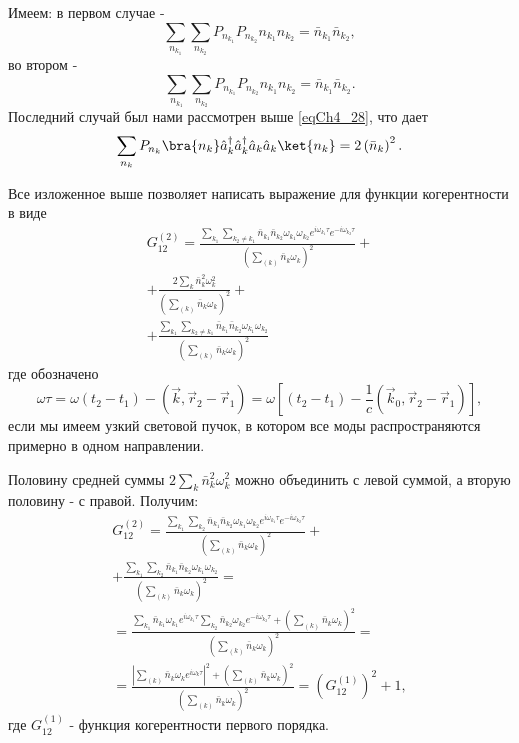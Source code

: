 Имеем: в первом случае -
\begin{equation}
\sum_{n_{k_1}}\sum_{n_{k_2}} P_{n_{k_1}} P_{n_{k_2}} 
n_{k_1} n_{k_2} = \bar{n}_{k_1} \bar{n}_{k_2},
\label{eqCh4_34}
\end{equation}
во втором -
\begin{equation}
\sum_{n_{k_1}}\sum_{n_{k_2}} P_{n_{k_1}} P_{n_{k_2}} 
n_{k_1} n_{k_2} = \bar{n}_{k_1} \bar{n}_{k_2}.
\label{eqCh4_35}
\end{equation}
Последний случай был нами рассмотрен выше \eqref{eqCh4_28}, что дает
\begin{equation}
\sum_{n_{k}} P_{n_{k}}
\bra{n_k}\hat{a}_k^{\dag}\hat{a}_k^{\dag}\hat{a}_k\hat{a}_k\ket{n_k}
= 2 \left(\bar{n}_k\right)^2.
\label{eqCh4_36}
\end{equation}

Все изложенное выше позволяет написать выражение для функции
когерентности в виде 
\begin{eqnarray}
G_{12}^{(2)} = \frac{\sum_{k_1}\sum_{k_2 \neq k_1} \bar{n}_{k_1}
  \bar{n}_{k_2} \omega_{k_1} \omega_{k_2} e^{i \omega_{k_1} \tau} 
e^{- i \omega_{k_2} \tau} } 
{\left(\sum_{(k)} \bar{n}_k \omega_k\right)^2} + 
\nonumber \\
+
\frac{2 \sum_{k} \bar{n}_{k}^2 \omega_k^2} 
{\left(\sum_{(k)} \bar{n}_k \omega_k\right)^2} + 
\nonumber \\
+
\frac{\sum_{k_1}\sum_{k_2 \neq k_1} \bar{n}_{k_1}
  \bar{n}_{k_2} \omega_{k_1} \omega_{k_2}} 
{\left(\sum_{(k)} \bar{n}_k \omega_k\right)^2}
\label{eqCh4_37}
\end{eqnarray}
где обозначено 
\[
\omega \tau = \omega \left(t_2 - t_1\right) - \left(\vec{k}, \vec{r}_2
- \vec{r}_1\right) = 
\omega \left[
\left(t_2 - t_1\right) - \frac{1}{c}\left(\vec{k}_0, \vec{r}_2
- \vec{r}_1\right)
\right],
\]
если мы имеем узкий световой пучок, в котором все моды
распространяются примерно в одном направлении. 

Половину средней суммы $2 \sum_{k} \bar{n}_{k}^2 \omega_k^2$ можно
объединить с левой суммой, а вторую половину - с правой. Получим: 
\begin{eqnarray}
G_{12}^{(2)} = \frac{\sum_{k_1}\sum_{k_2} \bar{n}_{k_1}
  \bar{n}_{k_2} \omega_{k_1} \omega_{k_2} e^{i \omega_{k_1} \tau} 
e^{- i \omega_{k_2} \tau}} 
{\left(\sum_{(k)} \bar{n}_k \omega_k\right)^2} + 
\nonumber \\
+ \frac{\sum_{k_1}\sum_{k_2} \bar{n}_{k_1}
  \bar{n}_{k_2} \omega_{k_1} \omega_{k_2}} 
{\left(\sum_{(k)} \bar{n}_k \omega_k\right)^2} = 
\nonumber \\
= 
\frac{\sum_{k_1}\bar{n}_{k_1} \omega_{k_1} e^{i \omega_{k_1} \tau}
\sum_{k_2}\bar{n}_{k_2} \omega_{k_2} e^{- i \omega_{k_2} \tau} +
\left(\sum_{(k)} \bar{n}_k \omega_k\right)^2
}
{\left(\sum_{(k)} \bar{n}_k \omega_k\right)^2} = 
\nonumber \\
= \frac{\left|\sum_{(k)}\bar{n}_{k} \omega_{k} e^{i \omega_{k}
  \tau}\right|^2 + \left(\sum_{(k)} \bar{n}_k \omega_k\right)^2}
{\left(\sum_{(k)} \bar{n}_k \omega_k\right)^2} = 
\left(G_{12}^{(1)}\right)^2 + 1,
\label{eqCh4_38}
\end{eqnarray}
где $G_{12}^{(1)}$ - функция когерентности
первого порядка.  

